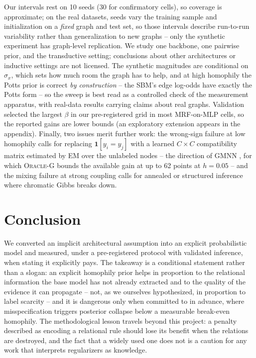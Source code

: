 \documentclass{article}
\begin{document}
Our intervals rest on 10 seeds (30 for confirmatory cells), so coverage is approximate; on the
real datasets, seeds vary the training sample and initialization on a \emph{fixed} graph and
test set, so those intervals describe run-to-run variability rather than generalization to new
graphs -- only the synthetic experiment has graph-level replication. We study one backbone, one
pairwise prior, and the transductive setting; conclusions about other architectures or
inductive settings are not licensed. The synthetic magnitudes are conditional on $\sigma_x$,
which sets how much room the graph has to help, and at high homophily the Potts prior is
correct \emph{by construction} -- the SBM's edge log-odds have exactly the Potts form -- so the
sweep is best read as a controlled check of the measurement apparatus, with real-data results
carrying claims about real graphs. Validation selected the largest $\beta$ in our
pre-registered grid in most MRF-on-MLP cells, so the reported gains are lower bounds (an
exploratory extension appears in the appendix). Finally, two issues merit further work: the
wrong-sign failure at low homophily calls for replacing $\mathbf{1}[y_i{=}y_j]$ with a learned
$C{\times}C$ compatibility matrix estimated by EM over the unlabeled nodes -- the direction of
GMNN \citep{qu2019gmnn}, for which \textsc{Oracle-G} bounds the available gain at up to 62
points at $h{=}0.05$ -- and the mixing failure at strong coupling calls for annealed or
structured inference where chromatic Gibbs breaks down.

\section{Conclusion}

We converted an implicit architectural assumption into an explicit probabilistic model and
measured, under a pre-registered protocol with validated inference, when stating it explicitly
pays. The takeaway is a conditional statement rather than a slogan: an explicit homophily prior
helps in proportion to the relational information the base model has not already extracted and
to the quality of the evidence it can propagate -- not, as we ourselves hypothesized, in
proportion to label scarcity -- and it is dangerous only when committed to in advance, where
misspecification triggers posterior collapse below a measurable break-even homophily. The
methodological lesson travels beyond this project: a penalty described as encoding a relational
rule should lose its benefit when the relations are destroyed, and the fact that a widely used
one does not is a caution for any work that interprets regularizers as knowledge.
\end{document}
